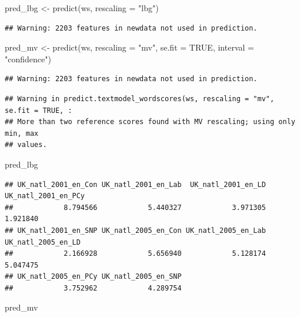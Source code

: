 \documentclass[
]{book}
\newenvironment{Shaded}{\begin{snugshade}}{\end{snugshade}}
\newcommand{\AttributeTok}[1]{\textcolor[rgb]{0.77,0.63,0.00}{#1}}
\newcommand{\ConstantTok}[1]{\textcolor[rgb]{0.00,0.00,0.00}{#1}}
\newcommand{\FunctionTok}[1]{\textcolor[rgb]{0.00,0.00,0.00}{#1}}
\newcommand{\NormalTok}[1]{#1}
\newcommand{\OtherTok}[1]{\textcolor[rgb]{0.56,0.35,0.01}{#1}}
\newcommand{\StringTok}[1]{\textcolor[rgb]{0.31,0.60,0.02}{#1}}
\begin{document}
\begin{Shaded}
\begin{Highlighting}[]
\NormalTok{pred\_lbg }\OtherTok{\textless{}{-}} \FunctionTok{predict}\NormalTok{(ws, }\AttributeTok{rescaling =} \StringTok{"lbg"}\NormalTok{)}
\end{Highlighting}
\end{Shaded}

\begin{verbatim}
## Warning: 2203 features in newdata not used in prediction.
\end{verbatim}

\begin{Shaded}
\begin{Highlighting}[]
\NormalTok{pred\_mv }\OtherTok{\textless{}{-}} \FunctionTok{predict}\NormalTok{(ws, }\AttributeTok{rescaling =} \StringTok{"mv"}\NormalTok{, }\AttributeTok{se.fit =} \ConstantTok{TRUE}\NormalTok{, }\AttributeTok{interval =} \StringTok{"confidence"}\NormalTok{)}
\end{Highlighting}
\end{Shaded}

\begin{verbatim}
## Warning: 2203 features in newdata not used in prediction.
\end{verbatim}

\begin{verbatim}
## Warning in predict.textmodel_wordscores(ws, rescaling = "mv", se.fit = TRUE, :
## More than two reference scores found with MV rescaling; using only min, max
## values.
\end{verbatim}

\begin{Shaded}
\begin{Highlighting}[]
\NormalTok{pred\_lbg}
\end{Highlighting}
\end{Shaded}

\begin{verbatim}
## UK_natl_2001_en_Con UK_natl_2001_en_Lab  UK_natl_2001_en_LD UK_natl_2001_en_PCy 
##            8.794566            5.440327            3.971305            1.921840 
## UK_natl_2001_en_SNP UK_natl_2005_en_Con UK_natl_2005_en_Lab  UK_natl_2005_en_LD 
##            2.166928            5.656940            5.128174            5.047475 
## UK_natl_2005_en_PCy UK_natl_2005_en_SNP 
##            3.752962            4.289754
\end{verbatim}

\begin{Shaded}
\begin{Highlighting}[]
\NormalTok{pred\_mv}
\end{Highlighting}
\end{Shaded}
\end{document}
